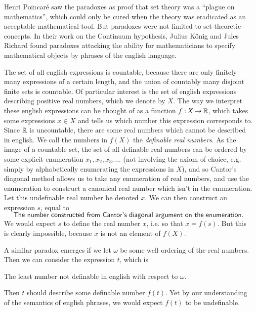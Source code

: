 Henri Poincar\'{e} saw the paradoxes as proof that set theory was a ``plague on mathematics'', which could only be cured when the theory was eradicated as an acceptable mathematical tool. But paradoxes were not limited to set-theoretic concepts. In their work on the Continuum hypothesis, Julius K\"{o}nig and Jules Richard found paradoxes attacking the ability for mathematicians to specify mathematical objects by phrases of the english language.

\begin{example}
    The set of all english expressions is countable, because there are only finitely many expressions of a certain length, and the union of countably many disjoint finite sets is countable. Of particular interest is the set of english expressions describing positive real numbers, which we denote by $X$. The way we interpret these english expressions can be thought of as a function $f: X \to \operatorname{\mathbb{R}}$, which takes some expressions $x \in X$ and tells us which number this expression corresponds to. Since $\operatorname{\mathbb{R}}$ is uncountable, there are some real numbers which cannot be described in english. We call the numbers in $f(X)$ the \emph{definable real numbers}. As the image of a countable set, the set of all definable real numbers can be ordered by some explicit enumeration $x_1, x_2, x_3, \dots$ (not involving the axiom of choice, e.g. simply by alphabetically enumerating the expressions in $X$), and so Cantor's diagonal method allows us to take any enumeration of real numbers, and use the enumeration to construct a canonical real number which isn't in the enumeration. Let this undefinable real number be denoted $x$. We can then construct an expression $s$, equal to
    \[ \textsf{The number constructed from Cantor's diagonal argument on the enumeration}. \]
    We would expect $s$ to define the real number $x$, i.e. so that $x = f(s)$. But this is clearly impossible, because $x$ is not an element of $f(X)$.

    A similar paradox emerges if we let $\omega$ be some well-ordering of the real numbers. Then we can consider the expression $t$, which is
    \begin{center}
        \textsf{The least number not definable in english with respect to $\omega$}.
    \end{center}
    Then $t$ should describe some definable number $f(t)$. Yet by our understanding of the semantics of english phrases, we would expect $f(t)$ to be undefinable.
\end{example}

